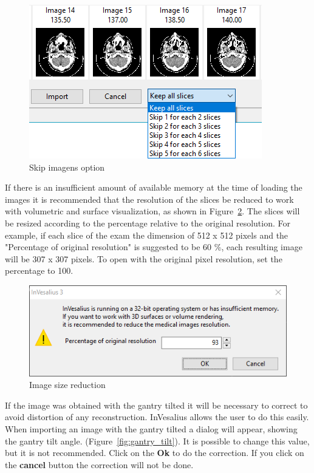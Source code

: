 \begin{figure}[!htb]
\centering
\includegraphics[scale=0.6]{../user_guide_figures/invesalius_screen/import_window_skip_slice_en.png}
\caption{Skip imagens option}
\label{fig:skip_image}
\end{figure}

If there is an insufficient amount of available memory at the time of loading the images it is recommended that the resolution of the slices be reduced to work with volumetric and surface visualization, as shown in Figure~\ref{fig:resize_image}.
The slices will be resized according to the percentage relative to the original resolution. For example, if each slice of the exam the dimension of 512 x 512 pixels and the "Percentage of original resolution" is suggested to be 60 \%, each resulting image will be 307 x 307 pixels. To open with the original pixel resolution, set the percentage to 100.

\begin{figure}[!htb]
\centering
\includegraphics[scale=0.5]{../user_guide_figures/invesalius_screen/import_window_lower_memory_en.png}
\caption{Image size reduction}
\label{fig:resize_image}
\end{figure}

If the image was obtained with the gantry tilted it will be necessary to correct to avoid distortion of any reconstruction. InVesalius allows the user to do this easily. When importing an image with the gantry tilted a dialog will appear, showing the gantry tilt angle. (Figure~\ref{fig:gantry_tilt}). It is possible to change this value, but it is not recommended. Click on the \textbf{Ok} to do the correction. If you click on the \textbf{cancel} button the correction will not be done.

